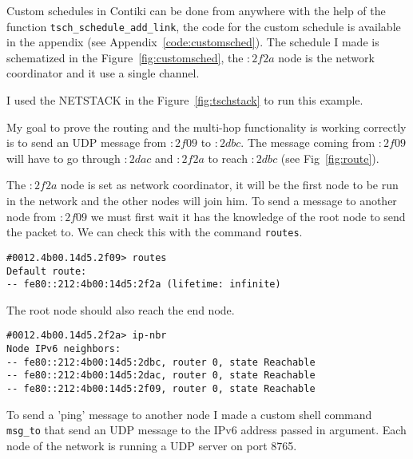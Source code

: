 Custom schedules in Contiki can be done from anywhere with the help of the
function \lstinline{tsch_schedule_add_link}, the code for the custom schedule
is available in the appendix (see Appendix~\ref{code:customsched}).
The schedule I made is schematized in the Figure~\ref{fig:customsched}, the $:2f2a$ 
node is the network coordinator and it use a single channel.



I used the NETSTACK in the Figure~\ref{fig:tschstack} to run this example.



My goal to prove the routing and the multi-hop functionality is working
correctly is to send an UDP message from $:2f09$ to $:2dbc$.
The message coming from $:2f09$ will have to go through $:2dac$ and $:2f2a$ to
reach $:2dbc$ (see Fig~\ref{fig:route}).





The $:2f2a$ node is set as network coordinator, it will be the first node to be
run in the network and the other nodes will join him.
To send a message to another node from $:2f09$ we must first wait it has
the knowledge of the root node to send the packet to.
We can check this with the command \lstinline{routes}.

\begin{lstlisting}[language=none]
#0012.4b00.14d5.2f09> routes
Default route:
-- fe80::212:4b00:14d5:2f2a (lifetime: infinite)
\end{lstlisting}

The root node should also reach the end node.

\begin{lstlisting}[language=none]
#0012.4b00.14d5.2f2a> ip-nbr
Node IPv6 neighbors:
-- fe80::212:4b00:14d5:2dbc, router 0, state Reachable 
-- fe80::212:4b00:14d5:2dac, router 0, state Reachable 
-- fe80::212:4b00:14d5:2f09, router 0, state Reachable 
\end{lstlisting}

To send a 'ping' message to another node I made a custom shell 
command \lstinline{msg_to} that send an UDP message to the IPv6 address 
passed in argument.
Each node of the network is running a UDP server on port 8765.

